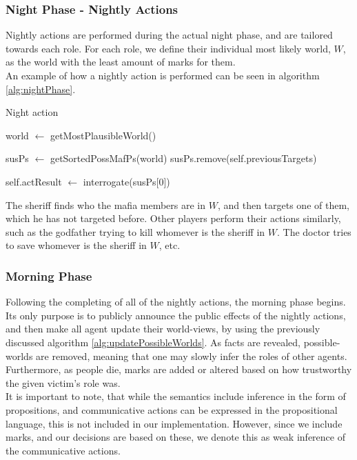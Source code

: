 \subsubsection{Night Phase - Nightly 
Actions}\label{sec:nightPhaseNightlyActions}
Nightly actions are performed during the actual night phase, and are tailored 
towards each role. For each role, we define their 
individual most likely world, $W$, as the world with the least amount of marks 
for them. \\
An example of how a nightly action is performed can be seen in algorithm 
\ref{alg:nightPhase}.
\begin{algorithm}[H]
	\caption{Night action}
	\begin{algorithmic}[1]
		\State world $\gets$ getMostPlausibleWorld()
		
		\State susPs $\gets$ getSortedPossMafPs(world)
		\State susPs.remove(self.previousTargets)
		
		\State self.actResult $\gets$ interrogate(susPs[0])
		\EndIf
		\EndFunction
		
		\Statex
	\end{algorithmic}\label{alg:nightPhase}
\end{algorithm}
\setcounter{algorithmcaption}{7}
The sheriff finds who the mafia members are in $W$, and then targets one of 
them, which he has not targeted before. Other players perform their actions 
similarly, such as the godfather trying to kill whomever is the sheriff in $W$. 
The doctor tries to save whomever is the sheriff in $W$, etc.
 
\subsubsection{Morning Phase}\label{sec:morningPhase}
Following the completing of all of the nightly actions, the morning phase 
begins. Its only purpose is to publicly announce the public effects of the 
nightly actions, and then make all agent update their world-views, by using the 
previously discussed algorithm \ref{alg:updatePossibleWorlds}.
As facts are revealed, possible-worlds are removed, meaning that one may slowly
infer the roles of other agents. Furthermore, as people die, marks are added or
altered based on how trustworthy the given victim's role was. \\
It is important to note, that while the semantics include inference in the form 
of propositions, and communicative actions can be expressed in the propositional
language, this is not included in our implementation. However, since we include
marks, and our decisions are based on these, we denote this as weak inference
of the communicative actions.


